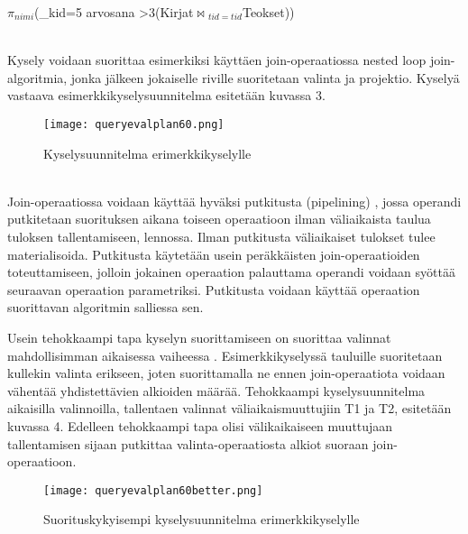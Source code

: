 \documentclass[finnish]{tktltiki2}
\theoremstyle{definition}
\theoremstyle{remark}
\begin{document}
\begin{frame}

$\pi$$_{nimi}$(\sigma_{kid=5 \wedge arvosana \textgreater 3}(Kirjat$\Join$$ _{tid=tid}$Teokset))
\end{frame}
\\\newline
Kysely voidaan suorittaa esimerkiksi käyttäen join-operaatiossa nested loop join-algoritmia, jonka jälkeen jokaiselle riville suoritetaan 
valinta ja projektio. Kyselyä vastaava esimerkkikyselysuunnitelma esitetään kuvassa 3.

\begin{figure}[!h] 
  \caption{Kyselysuunnitelma erimerkkikyselylle}
  \centering
    \texttt{[image: queryevalplan60.png]}
\end{figure}
\\\newline
Join-operaatiossa voidaan käyttää hyväksi putkitusta (pipelining) \cite{dalvi2001pipelining}, jossa operandi putkitetaan suorituksen aikana toiseen operaatioon ilman väliaikaista taulua tuloksen tallentamiseen, lennossa. Ilman putkitusta väliaikaiset tulokset tulee materialisoida. Putkitusta käytetään usein peräkkäisten join-operaatioiden toteuttamiseen, jolloin jokainen operaation palauttama operandi voidaan syöttää seuraavan operaation parametriksi. Putkitusta voidaan käyttää operaation suorittavan algoritmin salliessa sen.

Usein tehokkaampi tapa kyselyn suorittamiseen on suorittaa valinnat mahdollisimman aikaisessa vaiheessa \cite{ramakrishnan2003database}. Esimerkkikyselyssä tauluille suoritetaan kullekin valinta erikseen, joten suorittamalla ne ennen join-operaatiota voidaan vähentää yhdistettävien alkioiden määrää. Tehokkaampi kyselysuunnitelma aikaisilla valinnoilla, tallentaen valinnat väliaikaismuuttujiin T1 ja T2, esitetään kuvassa 4. Edelleen tehokkaampi tapa olisi välikaikaiseen muuttujaan tallentamisen sijaan putkittaa valinta-operaatiosta alkiot suoraan join-operaatioon.

 \begin{figure}[!h] 
  \caption{Suorituskykyisempi kyselysuunnitelma erimerkkikyselylle}
  \centering
    \texttt{[image: queryevalplan60better.png]}
\end{figure}
\\\newline
%
\end{document}
